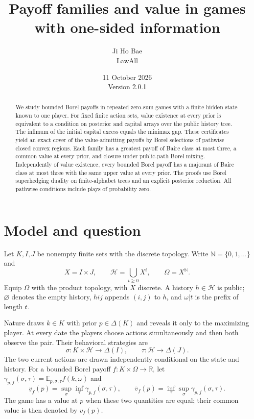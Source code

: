 \documentclass[11pt,a4paper]{article}
\title{Payoff families and value in games\\with one-sided information}
\author{Ji Ho Bae\\\small LawAll}
\date{11 October 2026\\\small Version 2.0.1}
\theoremstyle{definition}
\theoremstyle{remark}
\newcommand{\R}{\mathbb R}
\newcommand{\N}{\mathbb N}
\newcommand{\E}{\mathbb E}
\newcommand{\HH}{\mathcal H}
\newcommand{\lv}{\underline v}
\newcommand{\uv}{\overline v}
\begin{document}
\maketitle
\begin{abstract}
We study bounded Borel payoffs in repeated zero-sum games with a finite
hidden state known to one player. For fixed finite action sets, value
existence at every prior is equivalent to a condition on posterior and
capital arrays over the public history tree. The infimum of the initial capital
excess equals the minimax gap. These certificates yield an exact cover
of the value-admitting payoffs by Borel selections of pathwise closed
convex regions. Each family has a greatest payoff of Baire class at most
three, a common value at every prior, and closure under public-path
Borel mixing. Independently of value existence, every bounded Borel
payoff has a majorant of Baire class at most three with the same upper
value at every prior. The proofs use Borel superhedging duality on finite-alphabet trees
and an explicit posterior reduction. All pathwise conditions include
plays of probability zero.
\end{abstract}

\section{Model and question}\label{sec:model}

Let $K,I,J$ be nonempty finite sets with the discrete topology.
Write $\N=\{0,1,\ldots\}$ and
\[
 X=I\times J,\qquad \HH=\bigcup_{t\geq0}X^t,
 \qquad \Omega=X^{\N}.
\]
Equip $\Omega$ with the product topology, with $X$ discrete.
A history $h\in\HH$ is public; $\varnothing$ denotes the empty
history, $hij$ appends $(i,j)$ to $h$, and $\omega|t$ is the prefix of
length $t$.

Nature draws $k\in K$ with prior $p\in\Delta(K)$ and reveals it only to
the maximizing player. At every date the players choose actions
simultaneously and then both observe the pair. Their behavioral
strategies are
\[
 \sigma:K\times\HH\longrightarrow\Delta(I),\qquad
 \tau:\HH\longrightarrow\Delta(J).
\]
The two current actions are drawn independently conditional on the
state and history. For a bounded Borel payoff $f:K\times\Omega\to\R$,
let $\gamma_{p,f}(\sigma,\tau)=\E_{p,\sigma,\tau}f(k,\omega)$ and
\[
 \lv_f(p)=\sup_\sigma\inf_\tau\gamma_{p,f}(\sigma,\tau),\qquad
 \uv_f(p)=\inf_\tau\sup_\sigma\gamma_{p,f}(\sigma,\tau).
\]
The game has a value at $p$ when these two quantities are equal;
their common value is then denoted by $v_f(p)$.
\end{document}
